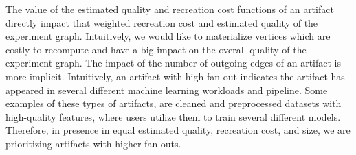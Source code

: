 The value of the estimated quality and recreation cost functions of an artifact directly impact that weighted recreation cost and estimated quality of the experiment graph.
Intuitively, we would like to materialize vertices which are costly to recompute and have a big impact on the overall quality of the experiment graph.
The impact of the number of outgoing edges of an artifact is more implicit.
Intuitively, an artifact with high fan-out indicates the artifact has appeared in several different machine learning workloads and pipeline.
Some examples of these types of artifacts, are cleaned and preprocessed datasets with high-quality features, where users utilize them to train several different models.
Therefore, in presence in equal estimated quality, recreation cost, and size, we are prioritizing artifacts with higher fan-outs.

%
%
